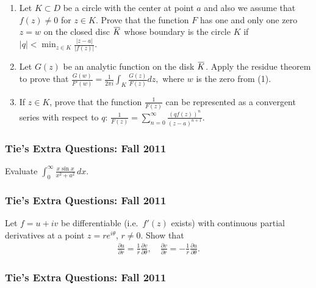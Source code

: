 \begin{enumerate}
\def\labelenumi{(\arabic{enumi})}
\item
  Let \(K\subset D\) be a circle with the center at point \(a\) and also
  we assume that \(f(z)\not =0\) for \(z\in K\). Prove that the function
  \(F\) has one and only one zero \(z=w\) on the closed disc
  \(\mkern 1.5mu\overline{\mkern-1.5muK\mkern-1.5mu}\mkern 1.5mu\) whose
  boundary is the circle \(K\) if
  \(\displaystyle{ |q|<\min_{z\in K} \frac{|z-a|}{|f(z)|}.}\)\\
\item
  Let \(G(z)\) be an analytic function on the disk
  \(\mkern 1.5mu\overline{\mkern-1.5muK\mkern-1.5mu}\mkern 1.5mu\).
  Apply the residue theorem to prove that
  \(\displaystyle{ \frac{G(w)}{F'(w)}=\frac{1}{2\pi i}\int_K \frac{G(z)}{F(z)} dz,}\)
  where \(w\) is the zero from (1).\\
\item
  If \(z\in K\), prove that the function
  \(\displaystyle{\frac{1}{F(z)}}\) can be represented as a convergent
  series with respect to \(q\):
  \(\displaystyle{ \frac{1}{F(z)}=\sum_{n=0}^{\infty} \frac{(qf(z))^n}{(z-a)^{n+1}}.}\)
\end{enumerate}

\hypertarget{ties-extra-questions-fall-2011-2}{%
\subsubsection{Tie's Extra Questions: Fall
2011}\label{ties-extra-questions-fall-2011-2}}

Evaluate
\(\displaystyle{ \int_{0}^{\infty}\frac{x\sin x}{x^2+a^2} \, dx }\).

\hypertarget{ties-extra-questions-fall-2011-3}{%
\subsubsection{Tie's Extra Questions: Fall
2011}\label{ties-extra-questions-fall-2011-3}}

Let \(f=u+iv\) be differentiable (i.e.~\(f'(z)\) exists) with continuous
partial derivatives at a point \(z=re^{i\theta}\), \(r\not= 0\). Show
that
\begin{align*}\frac{\partial u}{\partial r}=\frac{1}{r}\frac{\partial v}{\partial \theta},\quad
\frac{\partial v}{\partial r}=-\frac{1}{r}\frac{\partial u}{\partial \theta}.\end{align*}

\hypertarget{ties-extra-questions-fall-2011-4}{%
\subsubsection{Tie's Extra Questions: Fall
2011}\label{ties-extra-questions-fall-2011-4}}

